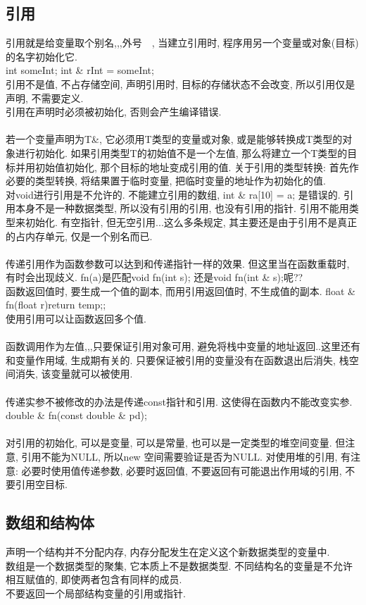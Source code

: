 \documentclass[a4paper,10pt,english]{article}
\begin{document}
\subsection {引用}
引用就是给变量取个别名,,,外号~~, 当建立引用时, 程序用另一个变量或对象(目标)的名字初始化它. \\
int someInt; int \& rInt = someInt; \\
引用不是值, 不占存储空间, 声明引用时, 目标的存储状态不会改变, 所以引用仅是声明, 不需要定义. \\
引用在声明时必须被初始化, 否则会产生编译错误. \\\\
若一个变量声明为T\&, 它必须用T类型的变量或对象, 或是能够转换成T类型的对象进行初始化. 如果引用类型T的初始值不是一个左值, 那么将建立一个T类型的目标并用初始值初始化, 那个目标的地址变成引用的值. 关于引用的类型转换: 首先作必要的类型转换, 将结果置于临时变量, 把临时变量的地址作为初始化的值. \\
对void进行引用是不允许的. 不能建立引用的数组, int \& ra[10] = a; 是错误的. 引用本身不是一种数据类型, 所以没有引用的引用, 也没有引用的指针. 引用不能用类型来初始化. 有空指针, 但无空引用...这么多条规定, 其主要还是由于引用不是真正的占内存单元, 仅是一个别名而已.\\\\
传递引用作为函数参数可以达到和传递指针一样的效果. 但这里当在函数重载时, 有时会出现歧义. fn(a)是匹配void fn(int s); 还是void fn(int \& s);呢??\\
函数返回值时, 要生成一个值的副本, 而用引用返回值时, 不生成值的副本. float \& fn(float r){return temp;}; \\
使用引用可以让函数返回多个值. \\\\
函数调用作为左值,,,只要保证引用对象可用, 避免将栈中变量的地址返回..这里还有和变量作用域, 生成期有关的. 只要保证被引用的变量没有在函数退出后消失, 栈空间消失, 该变量就可以被使用. \\\\
传递实参不被修改的办法是传递const指针和引用. 这使得在函数内不能改变实参. double \& fn(const double \& pd);  \\\\
对引用的初始化, 可以是变量, 可以是常量, 也可以是一定类型的堆空间变量. 但注意, 引用不能为NULL, 所以new 空间需要验证是否为NULL. 对使用堆的引用, 有注意: 必要时使用值传递参数, 必要时返回值, 不要返回有可能退出作用域的引用, 不要引用空目标. \\

\subsection{数组和结构体}
声明一个结构并不分配内存, 内存分配发生在定义这个新数据类型的变量中. \\
数组是一个数据类型的聚集, 它本质上不是数据类型. 不同结构名的变量是不允许相互赋值的, 即使两者包含有同样的成员. \\
不要返回一个局部结构变量的引用或指针.
\end{document}
